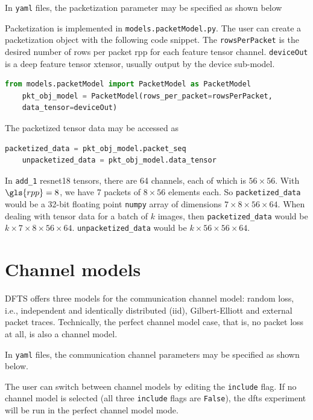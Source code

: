 In \verb|yaml| files, the packetization parameter may be specified as shown below

Packetization is implemented in \verb|models.packetModel.py|. The user can create a packetization object with the following code snippet. The \verb|rowsPerPacket| is the desired number of rows per packet \gls{rpp} for each feature tensor channel. \verb|deviceOut| is a deep feature tensor \gls{xtensor}, usually output by the device sub-model.

\begin{lstlisting}[language=Python, caption=Creating a packetization object]
	from models.packetModel import PacketModel as PacketModel
	pkt_obj_model = PacketModel(rows_per_packet=rowsPerPacket,
	data_tensor=deviceOut)
\end{lstlisting}

The packetized tensor data may be accessed as

\begin{lstlisting}[language=Python, caption=Manipulating packetized tensor data]
	packetized_data = pkt_obj_model.packet_seq
	unpacketized_data = pkt_obj_model.data_tensor
\end{lstlisting}

In \verb|add_1| \gls{resnet18} tensors, there are 64 channels, each of which is $56 \times 56$. With $\gls{rpp}=8$, we have 7 packets of $8 \times 56$ elements each. So \verb|packetized_data| would be a 32-bit floating point \verb|numpy| array of dimensions $7 \times 8 \times 56 \times 64$. When dealing with tensor data for a batch of $k$ images, then \verb|packetized_data| would be $k \times 7 \times 8 \times 56 \times 64$. \verb|unpacketized_data| would be $k \times 56 \times 56 \times 64$. 


\section{Channel models} \label{sec:simdescr:channel}
DFTS offers three models for the communication channel model: random loss, i.e., independent and identically distributed (iid), Gilbert-Elliott and external packet traces. Technically, the perfect channel model case, that is, no packet loss at all, is also a channel model.

In \verb|yaml| files, the communication channel parameters may be specified as shown below.

The user can switch between channel models by editing the \verb|include| flag. If no channel model is selected (all three \verb|include| flags are \verb|False|), the \gls{dfts} experiment will be run in the perfect channel model mode. 

